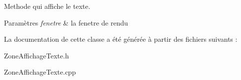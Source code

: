 \-Methode qui affiche le texte. 


\begin{DoxyParams}{\-Paramètres}
{\em fenetre} & la fenetre de rendu \\
\hline
\end{DoxyParams}


\-La documentation de cette classe a été générée à partir des fichiers suivants \-:\begin{DoxyCompactItemize}
\item 
\-Zone\-Affichage\-Texte.\-h\item 
\-Zone\-Affichage\-Texte.\-cpp\end{DoxyCompactItemize}
